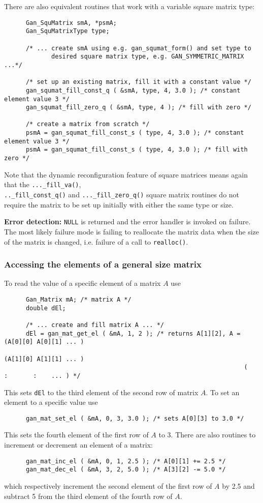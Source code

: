 There are also equivalent routines that work with a variable square
matrix type:
\begin{verbatim}
      Gan_SquMatrix smA, *psmA;
      Gan_SquMatrixType type;

      /* ... create smA using e.g. gan_squmat_form() and set type to
             desired square matrix type, e.g. GAN_SYMMETRIC_MATRIX ...*/

      /* set up an existing matrix, fill it with a constant value */
      gan_squmat_fill_const_q ( &smA, type, 4, 3.0 ); /* constant element value 3 */
      gan_squmat_fill_zero_q ( &smA, type, 4 ); /* fill with zero */

      /* create a matrix from scratch */
      psmA = gan_squmat_fill_const_s ( type, 4, 3.0 ); /* constant element value 3 */
      psmA = gan_squmat_fill_const_s ( type, 4, 3.0 ); /* fill with zero */
\end{verbatim}

Note that the dynamic reconfiguration feature of square matrices means again
that the {\tt ...\_fill\_va()},\\ {\tt ..\_fill\_const\_q()} and
{\tt ...\_fill\_zero\_q()} square matrix
routines do not require the matrix to be set up initially with either
the same type or size.

{\bf Error detection:} {\tt NULL} is returned and the error handler is
invoked on failure. The most likely failure mode is failing to reallocate
the matrix data when the size of the matrix is changed,
i.e. failure of a call to {\tt realloc()}.

\subsubsection{Accessing the elements of a general size matrix}
To read the value of a specific element of a matrix $A$ use
\begin{verbatim}
      Gan_Matrix mA; /* matrix A */
      double dEl;

      /* ... create and fill matrix A ... */
      dEl = gan_mat_get_el ( &mA, 1, 2 ); /* returns A[1][2], A = (A[0][0] A[0][1] ... )
                                                                  (A[1][0] A[1][1] ... )
                                                                  (   :       :    ... ) */
\end{verbatim}
This sets {\tt dEl} to the third element of the second row of matrix $A$.
To set an element to a specific value use
\begin{verbatim}
      gan_mat_set_el ( &mA, 0, 3, 3.0 ); /* sets A[0][3] to 3.0 */
\end{verbatim}
This sets the fourth element of the first row of $A$ to 3.
There are also routines to increment or decrement an element of a matrix:
\begin{verbatim}
      gan_mat_inc_el ( &mA, 0, 1, 2.5 ); /* A[0][1] += 2.5 */
      gan_mat_dec_el ( &mA, 3, 2, 5.0 ); /* A[3][2] -= 5.0 */
\end{verbatim}
which respectively increment the second element of the first row of $A$
by 2.5 and subtract 5 from the third element of the fourth row of $A$.

